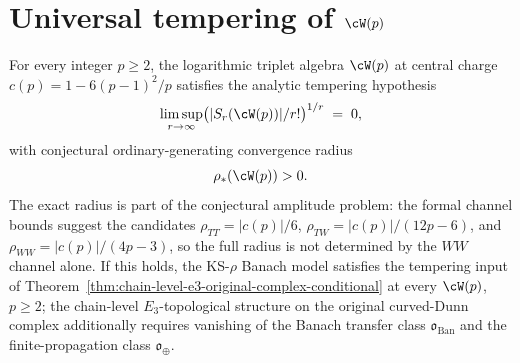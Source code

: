 \section{Universal tempering of $\cW(p)$}
\label{sec:universal-tempering-wp}

\begin{conjecture}
\label{conj:tempered-stratum-contains-wp}
For every integer $p \ge 2$, the logarithmic triplet algebra
$\cW(p)$ at central charge $c(p) = 1 - 6(p-1)^2 / p$ satisfies the
analytic tempering hypothesis
\[
 \limsup_{r \to \infty}
 \bigl( \lvert S_r(\cW(p)) \rvert / r! \bigr)^{1/r}
 \;=\; 0,
\]
with conjectural ordinary-generating convergence radius
\[
 \rho_*(\cW(p)) > 0.
\]
The exact radius is part of the conjectural amplitude problem: the
formal channel bounds suggest the candidates
$\rho_{TT}=\lvert c(p)\rvert/6$,
$\rho_{TW}=\lvert c(p)\rvert/(12p-6)$, and
$\rho_{WW}=\lvert c(p)\rvert/(4p-3)$, so the full radius is not
determined by the $WW$ channel alone.
If this holds, the KS-$\rho$ Banach model satisfies the tempering input
of Theorem~\ref{thm:chain-level-e3-original-complex-conditional} at
every $\cW(p)$, $p \ge 2$; the chain-level $E_3$-topological structure
on the original curved-Dunn complex additionally requires vanishing of
the Banach transfer class $\mathfrak{o}_{\mathrm{Ban}}$ and the
finite-propagation class $\mathfrak{o}_{\oplus}$.
\end{conjecture}

